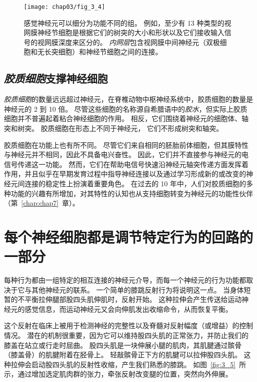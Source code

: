 \begin{figure}[htbp]
	\centering
	\texttt{[image: chap03/fig\_3\_4]}
	\caption{感觉神经元可以细分为功能不同的组。
		例如，至少有 13 种类型的视网膜神经节细胞是根据它们的树突的大小和形状以及它们接收输入信号的视网膜深度来区分的。
		\textit{内网层}包含视网膜中间神经元（双极细胞和无长突细胞）和神经节细胞之间的连接\cite{dacey2003fireworks}。}
	\label{fig:3_4}
\end{figure}



\subsection{\textit{胶质细胞}支撑神经细胞}
\textit{胶质细胞}的数量远远超过神经元，在脊椎动物中枢神经系统中，胶质细胞的数量是神经元的 2 到 10 倍。
尽管这些细胞的名称源自希腊语中的\textit{胶水}，但实际上胶质细胞并不普遍起着粘合神经细胞的作用。
相反，它们围绕着神经元的细胞体、轴突和树突。
胶质细胞在形态上不同于神经元，
它们不形成树突和轴突。


胶质细胞在功能上也有所不同。
尽管它们来自相同的胚胎前体细胞，但其膜特性与神经元并不相同，因此不具备电兴奋性。
因此，它们并不直接参与神经元的电信号传递这一功能。
然而，它们在帮助电信号快速沿神经元轴突传递方面发挥着作用，并且似乎在早期发育过程中指导神经连接以及通过学习形成新的或改变的神经元间连接的稳定性上扮演着重要角色。
在过去的 10 年中，人们对胶质细胞的多种功能的兴趣有所增加，对其特性的认知也从支持细胞转变为神经元的功能性伙伴（第~\ref{chap:chap7}~章）。



\section{每个神经细胞都是调节特定行为的回路的一部分}

每种行为都由一组特定的相互连接的神经元介导，而每一个神经元的行为功能都取决于它与其他神经元的联系。
一个简单的膝跳反射行为将说明这一点。 
当身体短暂的不平衡拉伸腿部股四头肌伸肌时，反射开始。
这种拉伸会产生传送给运动神经元的感觉信息，而运动神经元又会向伸肌发出收缩命令，从而恢复平衡。


这个反射在临床上被用于检测神经的完整性以及脊髓对反射幅度（或增益）的控制情况。 
潜在的机制很重要，因为它可以维持股四头肌的正常张力，并防止我们的膝盖在站立或行走时屈曲。 
股四头肌是一块伸展小腿的肌肉，其肌腱通过髌骨（膝盖骨）的肌腱附着在胫骨上。
轻敲髌骨正下方的肌腱可以拉伸股四头肌。 
这种拉伸会启动股四头肌的反射性收缩，产生我们熟悉的膝跳。 
如图~\ref{fig:3_5}~所示，通过增加选定肌肉群的张力，牵张反射改变腿的位置，突然向外伸展。

